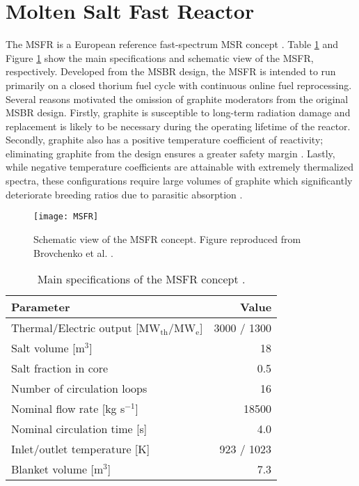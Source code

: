 \section{Molten Salt Fast Reactor} \label{sec:msfr}

The \gls{MSFR} is a European reference fast-spectrum \gls{MSR} concept
\cite{mathieu_thorium_2006, merle_optimized_2007}. Table \ref{table:msfr} and
Figure \ref{fig:msfr} show the main specifications and schematic view of the
\gls{MSFR}, respectively. Developed from the \gls{MSBR} design, the
\gls{MSFR} is intended to run primarily on a closed thorium fuel cycle with
continuous online fuel reprocessing. Several reasons motivated the omission of
graphite moderators from the original \gls{MSBR} design. Firstly, graphite is
susceptible to
long-term radiation damage and replacement is likely to be necessary during
the operating lifetime of the reactor. Secondly, graphite also has a positive
temperature coefficient of reactivity; eliminating graphite from the design
ensures a greater safety margin \cite{mathieu_thorium_2006}. Lastly, while
negative temperature coefficients are attainable with extremely thermalized
spectra, these configurations require large volumes of graphite which
significantly deteriorate breeding ratios due to parasitic absorption
\cite{mathieu_thorium_2006}.
%
\begin{figure}[htb!] 
	\centering
	\texttt{[image: MSFR]}
	\caption{Schematic view of the MSFR concept. Figure reproduced from
	Brovchenko et al. \cite{brovchenko_design-related_2013}.}
	\label{fig:msfr}
\end{figure}
%
\begin{table}[htb!]
    \small
	\caption{Main specifications of the \gls{MSFR} concept
				\cite{merle_concept_2017}.}
	\centering
	\begin{tabular}{ l r }
		\toprule
		Parameter & Value \\
		\midrule
		Thermal/Electric output [MW$_{\text{th}}$/MW$_{\text{e}}$] & 3000 /
		1300 
		\\
		Salt volume [m$^3$] & 18 \\
		Salt fraction in core & 0.5 \\
		Number of circulation loops & 16 \\
		Nominal flow rate [kg s$^{-1}$] & 18500  \\
		Nominal circulation time [s] & 4.0 \\
		Inlet/outlet temperature [K] & 923 / 1023 \\
		Blanket volume [m$^3$] & 7.3\\
		\bottomrule
	\end{tabular}
	\label{table:msfr}
\end{table}

